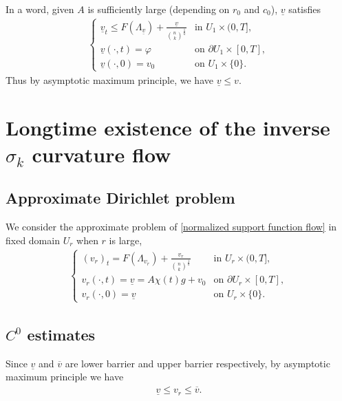 \documentclass[reqno]{amsart}
\theoremstyle{remark}
\theoremstyle{definition}
\numberwithin{equation}{section}
\begin{document}
In a word, given $A$ is sufficiently large (depending on $r_0$ and $c_0$), $\underline{v}$ satisfies
\begin{align*}
    \begin{cases}
    \underline{v}_t \leqslant F(\Lambda_{\underline{v}}) + \frac{\underline{v}}{\binom{n}{k}^{\frac{1}{k}}} & \text{in } U_1 \times (0, T], \\[4pt]
    \underline{v}(\cdot, t) = \varphi & \text{on } \partial U_1 \times [0, T], \\[4pt]
    \underline{v}(\cdot, 0) = v_0 & \text{on } U_1 \times \{0\}.
    \end{cases}
\end{align*}
Thus by asymptotic maximum principle, we have
$
\underline{v} \leqslant v.
$


\section{Longtime existence of the inverse \texorpdfstring{$\sigma_k$}{sigmak} curvature flow}\label{Longtime existence}


\subsection{Approximate Dirichlet problem}

We consider the approximate problem of \eqref{normalized support function flow} in fixed domain $U_r$ when $r$ is large, 
\begin{align}\label{approximate normalized support function flow}
    \begin{cases}
    (v_r)_t = F(\Lambda_{v_r}) + \frac{v_r}{\binom{n}{k}^{\frac{1}{k}}} & \text{in } U_r \times (0, T], \\[4pt]
    v_r(\cdot, t) = \underline{v} = A\chi(t)g + v_0 & \text{on } \partial U_r \times [0, T], \\[4pt]
    v_r(\cdot, 0) = \underline{v} & \text{on } U_r \times \{0\}.
    \end{cases}
\end{align}


\subsection{\texorpdfstring{$C^0$}{C0} estimates}

Since $\underline{v}$ and $\overline{v}$ are lower barrier and upper barrier respectively, by asymptotic maximum principle we have
\begin{align*}
    \underline{v} \leqslant v_r \leqslant \overline{v}.
\end{align*}
\end{document}
